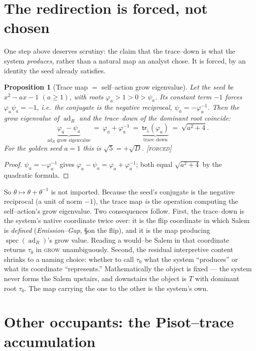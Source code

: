 \documentclass[11pt]{article}
\theoremstyle{plain}
\newtheorem{proposition}[theorem]{Proposition}
\theoremstyle{definition}
\theoremstyle{remark}
\newcommand{\forced}{\textcolor{forcedc}{\textsc{[forced]}}}
\newcommand{\spec}{\operatorname{spec}}
\newcommand{\ad}{\operatorname{ad}}
\newcommand{\trace}{\mathsf{tr}_{\!\downarrow}}
\begin{document}
\section{The redirection is forced, not chosen}\label{sec:forced}

One step above deserves scrutiny: the claim that the trace--down is what the system \emph{produces}, rather than a natural map an analyst chose. It is forced, by an identity the seed already satisfies.

\begin{proposition}[Trace map $=$ self--action grow eigenvalue]\label{prop:forced}
Let the seed be $x^2-ax-1$ $(a\ge1)$, with roots $\varphi_a>1>0>\psi_a$. Its constant term $-1$ forces $\varphi_a\psi_a=-1$, i.e.\ the conjugate is the negative reciprocal, $\psi_a=-\varphi_a^{-1}$. Then the grow eigenvalue of $\ad_R$ and the trace--down of the dominant root coincide:
\[
\underbrace{\varphi_a-\psi_a}_{\text{$\ad_R$ grow eigenvalue}}\ =\ \varphi_a+\varphi_a^{-1}\ =\ \underbrace{\trace(\varphi_a)}_{\text{trace--down}}\ =\ \sqrt{a^2+4}.
\]
For the golden seed $a=1$ this is $\sqrt5=+\sqrt D$. \forced
\end{proposition}
\begin{proof}
$\psi_a=-\varphi_a^{-1}$ gives $\varphi_a-\psi_a=\varphi_a+\varphi_a^{-1}$; both equal $\sqrt{a^2+4}$ by the quadratic formula.
\end{proof}

So $\theta\mapsto\theta+\theta^{-1}$ is not imported. Because the seed's conjugate is the negative reciprocal (a unit of norm $-1$), the trace map \emph{is} the operation computing the self--action's grow eigenvalue. Two consequences follow. First, the trace--down is the system's native coordinate twice over: it is the flip coordinate in which Salem is \emph{defined} (\emph{Emission--Gap}, \S on the flip), and it is the map producing $\spec(\ad_R)$'s grow value. Reading a would--be Salem in that coordinate returns $\tau_0$ in \textsc{grow} unambiguously. Second, the residual interpretive content shrinks to a naming choice: whether to call $\tau_0$ what the system ``produces'' or what its coordinate ``represents.'' Mathematically the object is fixed --- the system never forms the Salem upstairs, and downstairs the object is $T$ with dominant root $\tau_0$. The map carrying the one to the other is the system's own.

\section{Other occupants: the Pisot--trace accumulation}\label{sec:others}
\end{document}
